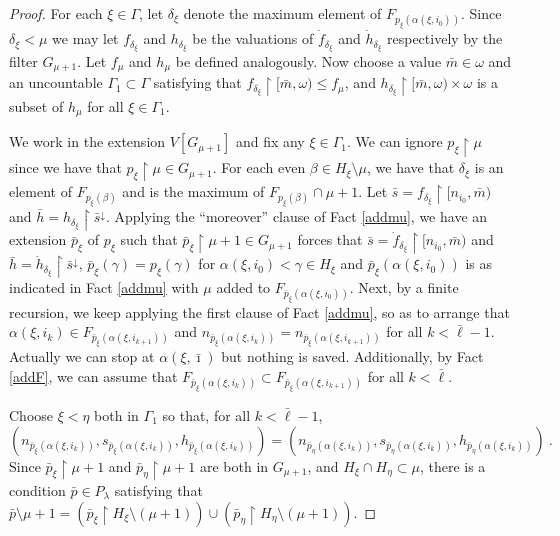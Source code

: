 \documentclass[10pt,a4paper]{amsart}
\begin{document}
\begin{proof}
For each $\xi\in\Gamma$, let $\delta_\xi$ denote the maximum
element of $F_{p_\xi(\alpha(\xi,i_0))}$.  Since $\delta_\xi<\mu$
we may  
let $f_{\delta_\xi}$ and $h_{\delta_\xi}$ be the valuations
of $\dot f_{\delta_\xi}$ and  $\dot h_{\delta_\xi}$ respectively
by the filter $G_{\mu+1}$. Let
 $f_\mu$ and $h_\mu$ be defined analogously.
Now choose a value $\bar m\in\omega$ and an uncountable
 $\Gamma_1\subset \Gamma$ satisfying that
  $f_{\delta_\xi} \restriction [\bar m,\omega)\leq f_\mu$,
  and 
   $h_{\delta_\xi}\restriction [\bar m,\omega)\times\omega$
   is a subset of $h_\mu$ for all $\xi\in \Gamma_1$.

We work in the extension $V[G_{\mu+1}]$ and fix any $\xi\in \Gamma_1$.
We can ignore $p_\xi\restriction \mu$ since we have
that $p_\xi\restriction \mu\in G_{\mu+1}$.  
 For each even $\beta\in H_\xi\setminus \mu$, 
 we have that  $\delta_\xi$ is an
 element of $F_{p_\xi(\beta)}$ and is
 the maximum of $F_{p_\xi(\beta)}\cap \mu+1$.
 Let $\bar s = f_{\delta_\xi}\restriction [n_{i_0} , \bar m)$
 and $\bar h = h_{\delta_\xi}\restriction \bar s^\downarrow$. 
Applying the ``moreover'' clause of Fact \ref{addmu}, we have an extension
 $\bar p_\xi$ of $p_\xi$ such
 that $\bar p_\xi \restriction \mu{+}1\in G_{\mu+1}$ forces
 that
 $\bar s = \dot f_{\delta_\xi}\restriction [n_{i_0} , \bar m)$
 and $\bar h = \dot h_{\delta_\xi}\restriction \bar s^\downarrow$,
 $\bar p_\xi(\gamma) = p_\xi(\gamma)$ for $\alpha(\xi,i_0)< \gamma \in H_\xi$
 and
  $\bar p_\xi(\alpha(\xi,i_0))$ is as indicated in Fact \ref{addmu}
  with $\mu$ added to $ F_{\bar p_\xi(\alpha(\xi,i_0))}$.
  Next, by a finite recursion, we keep applying the first
  clause of Fact \ref{addmu}, so as to arrange that
    $\alpha(\xi,i_k)\in F_{\bar p_\xi(\alpha(\xi,i_{k+1}))}$
    and
     $n_{\bar p_\xi(\alpha(\xi,i_k))}=n_{\bar p_\xi(\alpha(\xi,i_{k+1}))}$
     for all
     $  k<\bar \ell-1$.  
     Actually we can stop at
      $\alpha(\xi,\bar\imath ) $ but nothing is saved.
      Additionally, by Fact \ref{addF}, we can assume
      that $F_{\bar p_\xi(\alpha(\xi,i_k))} \subset
         F_{\bar p_\xi(\alpha(\xi,i_{k+1}))}$ for all $k<\bar\ell$.

 Choose $\xi <\eta$ both in $\Gamma_1$
 so that, for all $k < \bar \ell-1$,
  $$( n_{\bar p_\xi(\alpha(\xi,i_k))} , 
 s_{\bar p_\xi(\alpha(\xi,i_k))} , 
  h_{\bar p_\xi(\alpha(\xi,i_k))})
  =( n_{\bar p_\eta(\alpha(\xi,i_k))} , 
 s_{\bar p_\eta(\alpha(\xi,i_k))} , 
  h_{\bar p_\eta(\alpha(\xi,i_k))})
  ~.$$
 Since $\bar p_\xi \restriction \mu+1$ and
 $\bar p_\eta\restriction \mu+1$ are both in $G_{\mu+1}$,
 and $H_\xi\cap H_\eta\subset \mu$, there is a condition
  $\bar p\in P_\lambda$ satisfying that
   $\bar p\setminus \mu+1 = (\bar p_\xi \restriction H_\xi\setminus(\mu+1))
   \cup (\bar p_\eta \restriction H_\eta \setminus (\mu+1))$.
 

\end{proof}
\end{document}
